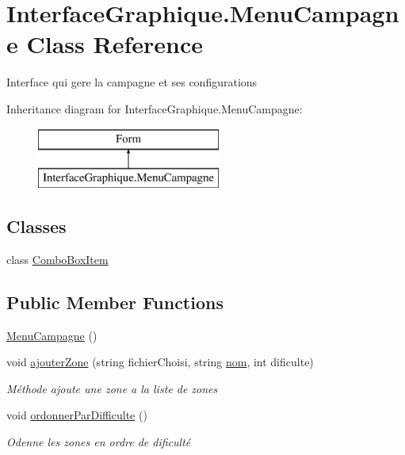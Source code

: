 \hypertarget{class_interface_graphique_1_1_menu_campagne}{\section{Interface\-Graphique.\-Menu\-Campagne Class Reference}
\label{class_interface_graphique_1_1_menu_campagne}
}


Interface qui gere la campagne et ses configurations  


Inheritance diagram for Interface\-Graphique.\-Menu\-Campagne\-:\begin{figure}[H]
\begin{center}
\leavevmode
\includegraphics[height=2.000000cm]{class_interface_graphique_1_1_menu_campagne}
\end{center}
\end{figure}
\subsection*{Classes}
\begin{DoxyCompactItemize}
\item 
class \hyperlink{class_interface_graphique_1_1_menu_campagne_1_1_combo_box_item}{Combo\-Box\-Item}
\end{DoxyCompactItemize}
\subsection*{Public Member Functions}
\begin{DoxyCompactItemize}
\item 
\hyperlink{class_interface_graphique_1_1_menu_campagne_a7cf3a1c419dcdea929b0252a357a6002}{Menu\-Campagne} ()
\item 
void \hyperlink{class_interface_graphique_1_1_menu_campagne_a91033d05622385a20396946033c442a1}{ajouter\-Zone} (string fichier\-Choisi, string \hyperlink{group__inf2990_gabe308d273ff51ad86ff02ef3ba3b6f0e}{nom}, int dificulte)
\begin{DoxyCompactList}\small\item\em Méthode ajoute une zone a la liste de zones \end{DoxyCompactList}\item 
void \hyperlink{class_interface_graphique_1_1_menu_campagne_a1ee6e09973646ffb8022ff1df74db94f}{ordonner\-Par\-Difficulte} ()
\begin{DoxyCompactList}\small\item\em Odenne les zones en ordre de dificulté \end{DoxyCompactList}\end{DoxyCompactItemize}
